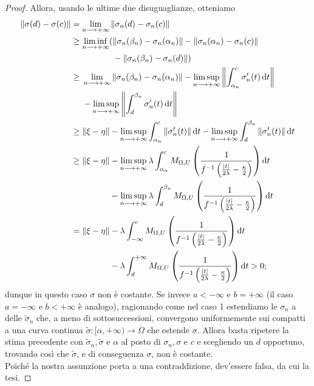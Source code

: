 \begin{proof}
    Allora, usando le ultime due disuguaglianze, otteniamo
    \begin{align*}
        \|\sigma(d)-\sigma(c)\|&=\lim_{n\longrightarrow+\infty}\|\sigma_n(d)-\sigma_n(c)\|\\
        &\ge\begin{aligned}[t]\liminf_{n\longrightarrow+\infty}(&\|\sigma_n(\beta_n)-\sigma_n(\alpha_n)\|-\|\sigma_n(\alpha_n)-\sigma_n(c)\|\\
        &-\|\sigma_n(\beta_n)-\sigma_n(d)\|)\end{aligned}\\
        &\ge\begin{aligned}[t]&\lim_{n\longrightarrow+\infty}\|\sigma_n(\beta_n)-\sigma_n(\alpha_n)\|-\limsup_{n\longrightarrow+\infty}\left\|\int_{\alpha_n}^c \sigma_n'(t)\diff t\right\|\\
        &-\limsup_{n\longrightarrow+\infty}\left\|\int_d^{\beta_n} \sigma_n'(t)\diff t\right\|\end{aligned}\\
        &\ge\|\xi-\eta\|-\limsup_{n\longrightarrow+\infty}\int_{\alpha_n}^c \|\sigma_n'(t)\|\diff t-\limsup_{n\longrightarrow+\infty}\int_d^{\beta_n} \|\sigma_n'(t)\|\diff t\\
        &\ge\begin{aligned}[t]\|\xi-\eta\|&-\limsup_{n\longrightarrow+\infty}\lambda\int_{\alpha_n}^c M_{\Omega,U}\left(\frac{1}{f^{-1}\left(\frac{|t|}{2\lambda}-\frac{\kappa}{2}\right)}\right)\diff t\\
        &-\limsup_{n\longrightarrow+\infty}\lambda\int_d^{\beta_n} M_{\Omega,U}\left(\frac{1}{f^{-1}\left(\frac{|t|}{2\lambda}-\frac{\kappa}{2}\right)}\right)\diff t\end{aligned}\\
        &=\begin{aligned}[t]\|\xi-\eta\|&-\lambda\int_{-\infty}^c M_{\Omega,U}\left(\frac{1}{f^{-1}\left(\frac{|t|}{2\lambda}-\frac{\kappa}{2}\right)}\right)\diff t\\
        &-\lambda\int_d^{+\infty} M_{\Omega,U}\left(\frac{1}{f^{-1}\left(\frac{|t|}{2\lambda}-\frac{\kappa}{2}\right)}\right)\diff t>0;\end{aligned}
    \end{align*}
    dunque in questo caso $\sigma$ non è costante. Se invece $a<-\infty$ e $b=+\infty$ (il caso $a=-\infty$ e $b<+\infty$ è analogo), ragionando come nel caso 1 estendiamo le $\sigma_n$ a delle $\tilde{\sigma}_n$ che, a meno di sottosuccessioni, convergono uniformemente sui compatti a una curva continua $\tilde{\sigma}:[\alpha,+\infty)\longrightarrow\overline{\Omega}$ che estende $\sigma$. Allora basta ripetere la stima precedente con $\tilde{\sigma}_n, \tilde{\sigma}$ e $\alpha$ al posto di $\sigma_n, \sigma$ e $c$ e scegliendo un $d$ opportuno, trovando così che $\tilde{\sigma}$, e di conseguenza $\sigma$, non è costante. \\

    Poiché la nostra assunzione porta a una contraddizione, dev'essere falsa, da cui la tesi.
\end{proof}

